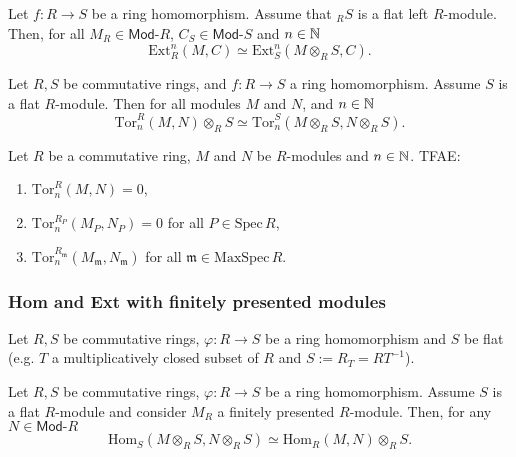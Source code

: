 \begin{prop}
	Let $f: R \to S$ be a ring homomorphism.
	Assume that ${}_RS$ is a flat left $R$-module.
	Then, for all $M_R \in \mathsf{Mod}\text{-}R$, $C_S \in \mathsf{Mod}\text{-}S$ and $n \in \mathbb{N}$
	\begin{equation}
		\mathrm{Ext}^n_R (M, C) \simeq
		\mathrm{Ext}^n_S (M \otimes_R S, C)
	.\end{equation} 
\end{prop} 

\begin{prop}
	Let $R, S$ be commutative rings, and $f: R \to S$ a ring homomorphism.
	Assume $S$ is a flat $R$-module.
	Then for all modules $M$ and $N$, and $n \in \mathbb{N}$
	\begin{equation}
		\mathrm{Tor}^R_n (M,N) \otimes_R S \simeq
		\mathrm{Tor}^S_n (M \otimes_R S, N \otimes_R S)
	.\end{equation} 
\end{prop} 


\begin{cor}
	Let $R$ be a commutative ring, $M$ and $N$ be $R$-modules and $n \in \mathbb{N}$.
	TFAE:
	\begin{enumerate}
		\item $\mathrm{Tor}^R_n (M,N) = 0$,
		\item $\mathrm{Tor}_n^{R_P}(M_P, N_P) = 0$ for all $P \in \mathrm{Spec}\, R$,
		\item $\mathrm{Tor}_n^{R_{\mathfrak{m}}} (M_{\mathfrak{m}}, N_{\mathfrak{m}})$
			for all $\mathfrak{m} \in \mathrm{MaxSpec}\, R$.
	\end{enumerate}
\end{cor} 

\subsubsection{Hom and Ext with finitely presented modules}
Let $R, S$ be commutative rings, $\varphi: R \to S$ be a ring homomorphism
and $S$ be flat (e.g. $T$ a multiplicatively closed subset of $R$
and $S := R_T = RT^{-1}$).

\begin{prop}
	Let $R,S$ be commutative rings, $\varphi: R \to S$ be a ring homomorphism.
	Assume $S$ is a flat $R$-module
	and consider $M_R$ a finitely presented $R$-module.
	Then, for any $N \in \mathsf{Mod}\text{-}R$
	\begin{equation}
	\mathrm{Hom}_{ S}\left( M \otimes_R S, N \otimes_R S \right) \simeq
	\mathrm{Hom}_{ R}\left( M, N \right) \otimes_R S
	.\end{equation} 	
\end{prop} 

